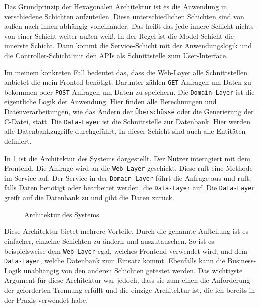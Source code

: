 Das Grundprinzip der Hexagonalen Architektur ist es die Anwendung in verschiedene Schichten aufzuteilen.
Diese unterschiedlichen Schichten sind von außen nach innen abhängig voneinander. Das heißt das jede innere Schicht nichts von einer Schicht weiter außen weiß.
In der Regel ist die Model-Schicht die innerste Schicht.
Dann kommt die Service-Schicht mit der Anwendungslogik und die Controller-Schicht mit den APIs als Schnittstelle zum User-Interface.

Im meinem konkreten Fall bedeutet das, dass die Web-Layer alle Schnittstellen anbietet die mein Fronted benötigt. Darunter zählen \texttt{GET}-Anfragen um Daten zu bekommen oder
\texttt{POST}-Anfragen um Daten zu speichern.
Die \texttt{Domain-Layer} ist die eigentliche Logik der Anwendung. Hier finden alle Berechnungen und Datenverarbeitungen, wie das Ändern der \texttt{Überschüsse} oder die Generierung der C-Datei, statt.
Die \texttt{Data-Layer} ist die Schnittstelle zur Datenbank. Hier werden alle Datenbankzugriffe durchgeführt. In dieser Schicht sind auch alle Entitäten definiert.

In \ref{fig:architecture} ist die Architektur des Systems dargestellt. Der Nutzer interagiert mit dem Frontend. Die Anfrage wird an die \texttt{Web-Layer} geschickt. 
Diese ruft eine Methode im Service auf. Der Service in der \texttt{Domain-Layer} führt die Anfrage aus und ruft, falls Daten benötigt oder bearbeitet werden, die \texttt{Data-Layer} auf.
Die \texttt{Data-Layer} greift auf die Datenbank zu und gibt die Daten zurück.

\begin{figure}[htbp]
  \resizebox{\textwidth}{!}{}
  \caption{Architektur des Systems}
  \label{fig:architecture}
\end{figure}

Diese Architektur bietet mehrere Vorteile. Durch die genannte Aufteilung ist es einfacher, einzelne Schichten zu ändern und auszutauschen. 
So ist es beispielsweise dem \texttt{Web-Layer} egal, welches Frontend verwendet wird, und dem \texttt{Data-Layer}, welche Datenbank zum Einsatz kommt.
Ebenfalls kann die Business-Logik unabhängig von den anderen Schichten getestet werden.
Das wichtigste Argument für diese Architektur war jedoch, dass sie zum einen die Anforderung der geforderten Trennung erfüllt und die einzige Architektur ist, die ich bereits in der Praxis verwendet habe.

